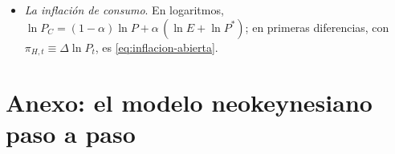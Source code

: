 \documentclass[11pt]{article}
\begin{document}
\begin{itemize}
\begin{equation*}
  \frac{W}{P_C^e}=F(U,Z)\cdot\mathrm{PAT}^e,\qquad \frac{W}{P}=\frac{\mathrm{PAT}}{1+\mu}\quad\Longrightarrow\quad P=(1+\mu)\,P_C^e\,F(U,Z)\,\frac{\mathrm{PAT}^e}{\mathrm{PAT}} .
  \end{equation*}
  \begin{itemize}
  \item \emph{A corto plazo}, con $P_C^e$ dado y $U$ que baja cuando sube $Y$, es la OA creciente; sube si suben los precios de consumo esperados (una depreciación esperada), el margen (la energía) o $Z$.
  \item \emph{A medio plazo}, con $P_C^e=P_C$ y $\mathrm{PAT}^e=\mathrm{PAT}$, $1=(1+\mu)\,q^{\alpha}F(U^n,Z)$, que es \eqref{eq:nairu-abierta}. Como $F_U<0$, un $q$ o un $\mu$ mayores bajan $F(U^n,Z)$ y suben $U^n$. Con $\alpha=0$ es la NAIRU de la economía cerrada.
  \item \emph{Un matiz}: con $E$ fijo, un $P$ mayor baja $q$ y la NAIRU, y la OA de largo plazo se inclina algo hacia la derecha; con $E$ flexible, $q$ lo fijan factores reales y es vertical. El cuerpo la dibuja vertical, para una cuña dada.
  \end{itemize}
\item \emph{La inflación de consumo}. En logaritmos, $\ln P_C=(1-\alpha)\ln P+\alpha\,(\ln E+\ln P^*)$; en primeras diferencias, con $\pi_{H,t}\equiv\Delta\ln P_t$, es \eqref{eq:inflacion-abierta}.
\end{itemize}
\findemo


\section{Anexo: el modelo neokeynesiano paso a paso}\label{anexo:nek}
\end{document}
